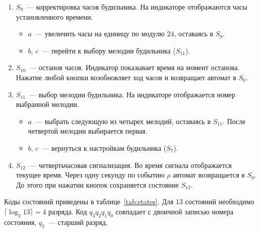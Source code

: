 \begin{enumerate}[itemsep=0.3\baselineskip]
	\item $S_9$~--- корректировка часов будильника. На индикаторе отображаются часы установленного времени.
	\begin{itemize}
		\item $a$~--- увеличить часы на единицу по модулю $24$, оставаясь в $S_9$.
		\item $b$, $c$~--- перейти к выбору мелодии будильника ($S_{11}$).
	\end{itemize}

	\item $S_{10}$~--- останов часов. Индикатор показывает время на момент останова. Нажатие любой кнопки возобновляет ход часов и возвращает автомат в $S_0$.

	\item $S_{11}$~--- выбор мелодии будильника. На индикаторе отображается номер выбранной мелодии.
	\begin{itemize}
		\item $a$~--- выбрать следующую из четырех мелодий, оставаясь в $S_{11}$. После четвертой мелодии выбирается первая.
		\item $b$, $c$~--- вернуться к настройкам будильника ($S_7$).
	\end{itemize}

	\item $S_{12}$~--- четвертьчасовая сигнализация. Во время сигнала отображается текущее время. Через одну секунду по событию $\rho$ автомат возвращается в $S_0$. До этого при нажатии кнопок сохраняется состояние $S_{12}$.
\end{enumerate}

\newpage
Коды состояний приведены в таблице~\ref{tab:states}. Для 13 состояний необходимо $\lceil\log_2 13\rceil = 4$ разряда. Код $q_3q_2q_1q_0$ совпадает с двоичной записью номера состояния, $q_3$~--- старший разряд.

